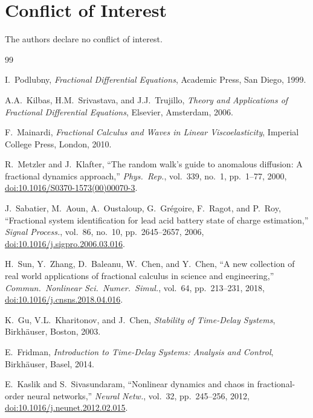 \documentclass[12pt,a4paper]{article}
\begin{document}
\section*{Conflict of Interest}

The authors declare no conflict of interest.

\begin{thebibliography}{99}

I.\ Podlubny, \textit{Fractional Differential Equations}, Academic Press, San Diego, 1999.

A.A.\ Kilbas, H.M.\ Srivastava, and J.J.\ Trujillo, \textit{Theory and Applications of Fractional Differential Equations}, Elsevier, Amsterdam, 2006.

F.\ Mainardi, \textit{Fractional Calculus and Waves in Linear Viscoelasticity}, Imperial College Press, London, 2010.

R.\ Metzler and J.\ Klafter, ``The random walk's guide to anomalous diffusion: A fractional dynamics approach,'' \textit{Phys.\ Rep.}, vol.\ 339, no.\ 1, pp.\ 1--77, 2000, \href{https://doi.org/10.1016/S0370-1573(00)00070-3}{doi:10.1016/S0370-1573(00)00070-3}.

J.\ Sabatier, M.\ Aoun, A.\ Oustaloup, G.\ Grégoire, F.\ Ragot, and P.\ Roy, ``Fractional system identification for lead acid battery state of charge estimation,'' \textit{Signal Process.}, vol.\ 86, no.\ 10, pp.\ 2645--2657, 2006, \href{https://doi.org/10.1016/j.sigpro.2006.03.016}{doi:10.1016/j.sigpro.2006.03.016}.

H.\ Sun, Y.\ Zhang, D.\ Baleanu, W.\ Chen, and Y.\ Chen, ``A new collection of real world applications of fractional calculus in science and engineering,'' \textit{Commun.\ Nonlinear Sci.\ Numer.\ Simul.}, vol.\ 64, pp.\ 213--231, 2018, \href{https://doi.org/10.1016/j.cnsns.2018.04.016}{doi:10.1016/j.cnsns.2018.04.016}.

K.\ Gu, V.L.\ Kharitonov, and J.\ Chen, \textit{Stability of Time-Delay Systems}, Birkhäuser, Boston, 2003.

E.\ Fridman, \textit{Introduction to Time-Delay Systems: Analysis and Control}, Birkhäuser, Basel, 2014.

E.\ Kaslik and S.\ Sivasundaram, ``Nonlinear dynamics and chaos in fractional-order neural networks,'' \textit{Neural Netw.}, vol.\ 32, pp.\ 245--256, 2012, \href{https://doi.org/10.1016/j.neunet.2012.02.015}{doi:10.1016/j.neunet.2012.02.015}.


\end{thebibliography}
\end{document}
